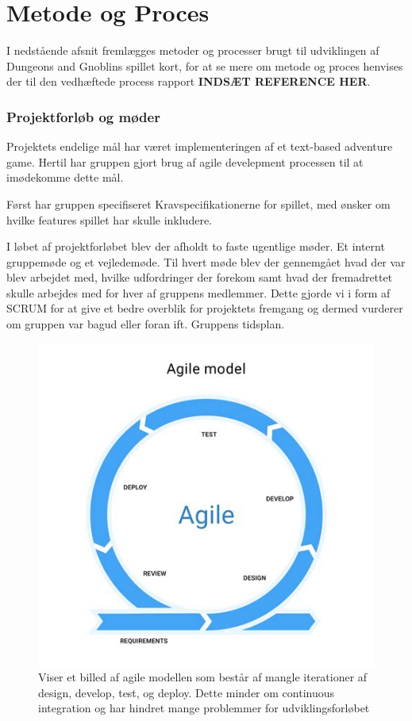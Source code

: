 \newpage

\section{Metode og Proces}
I nedstående afsnit fremlægges metoder og processer brugt til udviklingen af
Dungeons and Gnoblins spillet kort, for at se mere om metode og proces henvises der til den vedhæftede process rapport \textbf{INDSÆT REFERENCE HER}.

\subsubsection{Projektforløb og møder}
Projektets endelige mål har været implementeringen af et text-based adventure game.
Hertil har gruppen gjort brug af agile develepment processen til at imødekomme dette mål.

Først har gruppen specifiseret Kravspecifikationerne for spillet, med ønsker om
hvilke features spillet har skulle inkludere.

I løbet af projektforløbet blev der afholdt to faste ugentlige møder. Et internt gruppemøde og et vejledemøde. Til hvert møde blev der gennemgået hvad der var blev arbejdet med, hvilke udfordringer der forekom samt hvad der fremadrettet skulle arbejdes med for hver af gruppens medlemmer. Dette gjorde vi i form af SCRUM for at give et bedre overblik for projektets fremgang og dermed vurderer om gruppen var bagud eller foran ift. Gruppens tidsplan.

\begin{figure}[H]
  \centering
  \includegraphics[scale=.5]{02-Body/Images/Agile.png}
  \caption{Viser et billed af agile modellen som består af mangle iterationer
           af design, develop, test, og deploy. Dette minder om continuous integration
           og har hindret mange problemmer for udviklingsforløbet}
  \label{fig:Agile}
\end{figure}

